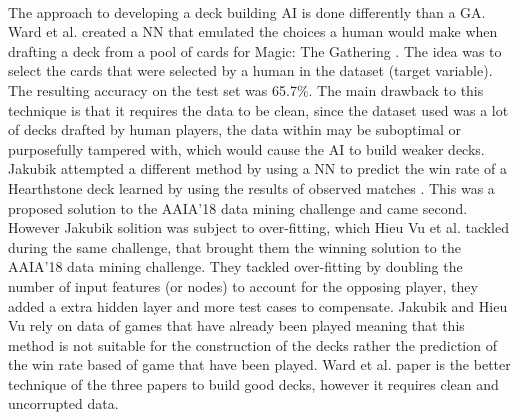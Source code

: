 \documentclass{report}
\begin{document}
\\
\indent The approach to developing a deck building AI is done differently than a GA. Ward et al. created a NN that emulated the choices a human would make when drafting a deck from a pool of cards for Magic: The Gathering \cite{Ward2020}. The idea was to select the cards that were selected by a human in the dataset (target variable). The resulting accuracy on the test set was 65.7\%. The main drawback to this technique is that it requires the data to be clean, since the dataset used was a lot of decks drafted by human players, the data within may be suboptimal or purposefully tampered with, which would cause the AI to build weaker decks. \\
\indent Jakubik attempted a different method by using a NN to predict the win rate of a Hearthstone deck learned by using the results of observed matches \cite{NNWRPrediction}. This was a proposed solution to the AAIA’18 data mining challenge and came second. However Jakubik solition was subject to over-fitting, which Hieu Vu et al. tackled during the same challenge, that brought them the winning solution to the AAIA’18 data mining challenge\cite{PredictWR}. They tackled over-fitting by doubling the number of input features (or nodes) to account for the opposing player, they added a extra hidden layer and more test cases to compensate. Jakubik \cite{NNWRPrediction} and Hieu Vu \cite{PredictWR} rely on data of games that have already been played meaning that this method is not suitable for the construction of the decks rather the prediction of the win rate based of game that have been played. Ward et al. paper is the better technique of the three papers to build good decks, however it requires clean and uncorrupted data.
 
\end{document}
